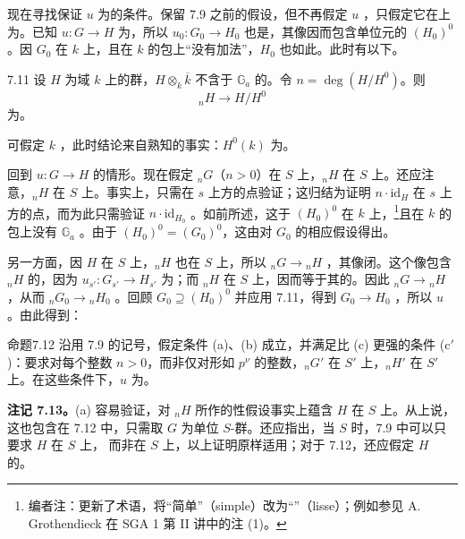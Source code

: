 现在寻找保证 $u$ 为的条件。保留 7.9 之前的假设，但不再假定 $u$ ，只假定它在上为。已知 $u:G\to H$ 为，所以 $u_0:G_0\to H_0$ 也是，其像因而包含单位元的 $(H_0)^0$。因 $G_0$ 在 $k$ 上，且在 $k$ 的包上“没有加法”，$H_0$ 也如此。此时有以下。
\begin{SGAresult}{}{7.11}
设 $H$ 为域 $k$ 上的群，$H\otimes_k\overline k$ 不含于 $\mathbb G_a$ 的。令 $n=\deg(H/H^0)$。则
\[
{}_nH\longrightarrow H/H^0
\]
为。
\end{SGAresult}
可假定 $k$ ，此时结论来自熟知的事实：$H^0(k)$ 为。

回到 $u:G\to H$ 的情形。现在假定 ${}_nG$（$n>0$）在 $S$ 上，${}_nH$ 在 $S$ 上。还应注意，${}_nH$ 在 $S$ 上。事实上，只需在 $s$ 上方的点验证；这归结为证明 $n\cdot\mathrm{id}_H$ 在 $s$ 上方的点，而为此只需验证 $n\cdot\mathrm{id}_{H_0}$ 。如前所述，这于 $(H_0)^0$ 在 $k$ 上，\footnote[40]{编者注：更新了术语，将“简单”（simple）改为“”（lisse）；例如参见 A. Grothendieck 在 SGA 1 第 II 讲中的注 (1)。}且在 $k$ 的包上没有 $\mathbb G_a$ 。由于 $(H_0)^0=(G_0)^0$，这由对 $G_0$ 的相应假设得出。

另一方面，因 $H$ 在 $S$ 上，${}_nH$ 也在 $S$ 上，所以 ${}_nG\to{}_nH$ ，其像闭。这个像包含 ${}_nH$ 的，因为 $u_{s'}:G_{s'}\to H_{s'}$ 为；而 ${}_nH$ 在 $S$ 上，因而等于其的。因此 ${}_nG\to{}_nH$ ，从而 ${}_nG_0\to{}_nH_0$ 。回顾 $G_0\supseteq(H_0)^0$ 并应用 7.11，得到 $G_0\to H_0$ ，所以 $u$ 。由此得到：
\begin{SGAresult}{命题}{7.12}
沿用 7.9 的记号，假定条件 (a)、(b) 成立，并满足比 (c) 更强的条件 (c$'$)：要求对每个整数 $n>0$，而非仅对形如 $p^\nu$ 的整数，${}_nG'$ 在 $S'$ 上，${}_nH'$ 在 $S'$ 上。在这些条件下，$u$ 为。
\end{SGAresult}
\textbf{注记 7.13。}(a) 容易验证，对 ${}_nH$ 所作的性假设事实上蕴含 $H$ 在 $S$ 上。从上说，这也包含在 7.12 中，只需取 $G$ 为单位 $S$-群。还应指出，当 $S$  时，7.9 中可以只要求 $H$ 在 $S$ 上，
而非在 $S$ 上，以上证明原样适用；对于 7.12，还应假定 $H$ 的。

